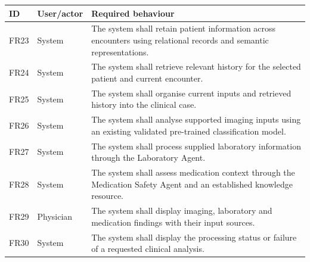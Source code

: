 \begin{reporttable}
\centering
\small
\caption{Memory and specialised case processing.}
\label{tab:kashaf:fr-processing}
\begin{tabular}{|p{}|p{}|p{}|}
\hline
ID & User/actor & Required behaviour \\ \hline
FR23 & System & The system shall retain patient information across encounters using relational records and semantic representations. \\ \hline
FR24 & System & The system shall retrieve relevant history for the selected patient and current encounter. \\ \hline
FR25 & System & The system shall organise current inputs and retrieved history into the clinical case. \\ \hline
FR26 & System & The system shall analyse supported imaging inputs using an existing validated pre-trained classification model. \\ \hline
FR27 & System & The system shall process supplied laboratory information through the Laboratory Agent. \\ \hline
FR28 & System & The system shall assess medication context through the Medication Safety Agent and an established knowledge resource. \\ \hline
FR29 & Physician & The system shall display imaging, laboratory and medication findings with their input sources. \\ \hline
FR30 & System & The system shall display the processing status or failure of a requested clinical analysis. \\ \hline
\end{tabular}
\end{reporttable}

